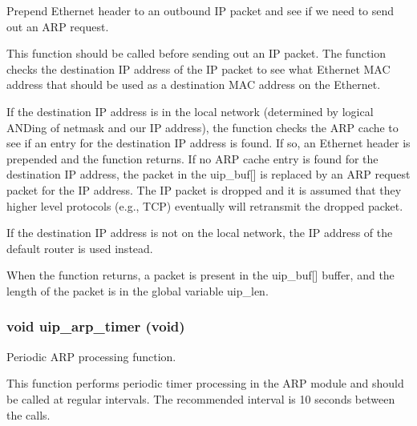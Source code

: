 Prepend Ethernet header to an outbound IP packet and see if we need to send out an ARP request. 

This function should be called before sending out an IP packet. The function checks the destination IP address of the IP packet to see what Ethernet MAC address that should be used as a destination MAC address on the Ethernet.

If the destination IP address is in the local network (determined by logical ANDing of netmask and our IP address), the function checks the ARP cache to see if an entry for the destination IP address is found. If so, an Ethernet header is prepended and the function returns. If no ARP cache entry is found for the destination IP address, the packet in the uip\_\-buf\mbox{[}\mbox{]} is replaced by an ARP request packet for the IP address. The IP packet is dropped and it is assumed that they higher level protocols (e.g., TCP) eventually will retransmit the dropped packet.

If the destination IP address is not on the local network, the IP address of the default router is used instead.

When the function returns, a packet is present in the uip\_\-buf\mbox{[}\mbox{]} buffer, and the length of the packet is in the global variable uip\_\-len. \hypertarget{a00067_g058a8e6025f67b021862281f1911fcef}{
\subsubsection[uip\_\-arp\_\-timer]{\setlength{\rightskip}{0pt plus 5cm}void uip\_\-arp\_\-timer (void)}}
\label{a00067_g058a8e6025f67b021862281f1911fcef}


Periodic ARP processing function. 

This function performs periodic timer processing in the ARP module and should be called at regular intervals. The recommended interval is 10 seconds between the calls. 